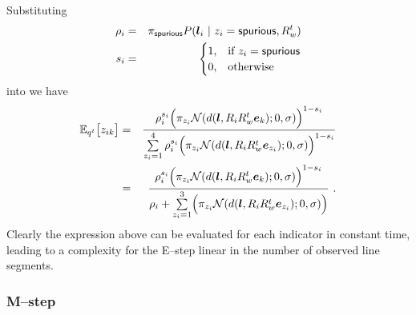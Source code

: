 Substituting
\begin{eqnarray}
  \SpurJoint_i &=& 
    \Mixing_{\Spurious}
    P(\LineSeg_i ~|~ \Indicator_i=\Spurious,\SceneR^t) \\
  \SpurIndicator_i &=&
    \begin{cases}
      1, & \mbox{if } \Indicator_i = \Spurious \\
      0, & \mbox{otherwise}
    \end{cases}\\
\end{eqnarray}
into  we have
\begin{eqnarray}
  \Expected_{\PosteriorEst^t}\bigl[ \Indicator_{ik} \bigr]
  &=&
  \frac{
    \SpurJoint_i^{\SpurIndicator_i}
    \Bigl(
      \Mixing_{\Indicator_i}
      \NormalDistr(\dist(\LineSeg,\CamR_i\SceneR^t\ebasis_k); 0, \sigma)
    \Bigr)^{1-\SpurIndicator_i}
  }{
    \sum_{\Indicator_i=1}^4\limits
    \SpurJoint_i^{\SpurIndicator_i}
    \Bigl(
      \Mixing_{\Indicator_i}
      \NormalDistr(\dist(\LineSeg,\CamR_i\SceneR^t\ebasis_{\Indicator_i}); 0, \sigma)
    \Bigr)^{1-\SpurIndicator_i}
  }\\
  &=&
  \frac{
    \SpurJoint_i^{\SpurIndicator_i}
    \Bigl(
      \Mixing_{\Indicator_i}
      \NormalDistr(\dist(\LineSeg,\CamR_i\SceneR^t\ebasis_k); 0, \sigma)
    \Bigr)^{1-\SpurIndicator_i}
  }{
    \SpurJoint_i +
    \sum_{\Indicator_i=1}^3\limits
    \Bigl(
      \Mixing_{\Indicator_i}
      \NormalDistr(\dist(\LineSeg,\CamR_i\SceneR^t\ebasis_{\Indicator_i}); 0, \sigma)
    \Bigr)
  }~.
\end{eqnarray}
Clearly the expression above can be evaluated for each indicator in
constant time, leading to a complexity for the E--step linear
in the number of observed line segments.

\subsubsection{M--step}

